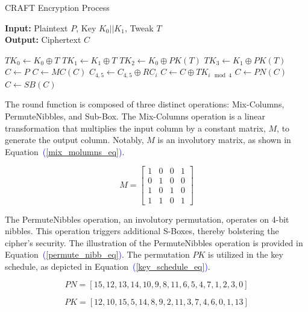 \documentclass[final,5p,times,twocolumn]{elsarticle}
\begin{document}
\begin{algorithm}[h]
    \caption{CRAFT Encryption Process}\label{alg1}
    \textbf{Input:} Plaintext $P$, Key $K_0||K_1$, Tweak $T$ \\
    \textbf{Output:} Ciphertext $C$
    \begin{algorithmic}[1]
        \State $TK_0 \gets K_0\oplus T$
        \State $TK_1 \gets K_1\oplus T$
        \State $TK_2 \gets K_0\oplus PK(T)$
        \State $TK_3 \gets K_1\oplus PK(T)$
        \State $C \gets P$
        \State $C \gets MC(C)$
        \State $C_{4,5} \gets C_{4,5}\oplus RC_i$
        \State $C \gets C \oplus TK_{i\mod 4}$
        \State $C \gets PN(C)$
        \State $C \gets SB(C)$
        \EndIf
        \EndFor
    \end{algorithmic}
\end{algorithm}

The round function is composed of three distinct operations: Mix-Columns, PermuteNibbles, and Sub-Box.
The Mix-Columns operation is a linear transformation that multiplies the input column by a constant matrix, $M$, to generate the output column. Notably, $M$ is an involutory matrix, as shown in Equation~\textcolor{blue}{(\ref{mix_molumns_eq})}.


\begin{equation}
    M =
    \begin{bmatrix}
        1 & 0 & 0 & 1 \\
        0 & 1 & 0 & 0 \\
        1 & 0 & 1 & 0 \\
        1 & 1 & 0 & 1
    \end{bmatrix}
    \label{mix_molumns_eq}
\end{equation}

The PermuteNibbles operation, an involutory permutation, operates on 4-bit nibbles. This operation triggers additional S-Boxes, thereby bolstering the cipher's security. The illustration of the PermuteNibbles operation is provided in Equation~\textcolor{blue}{(\ref{permute_nibb_eq})}. The permutation $PK$ is utilized in the key schedule, as depicted in Equation~\textcolor{blue}{(\ref{key_schedule_eq})}.

\begin{equation}
    PN=[15,12,13,14,10,9,8,11,6,5,4,7,1,2,3,0]
    \label{permute_nibb_eq}
\end{equation}

\begin{equation}
    PK=[12,10,15,5,14,8,9,2,11,3,7,4,6,0,1,13]
    \label{key_schedule_eq}
\end{equation}
\end{document}
